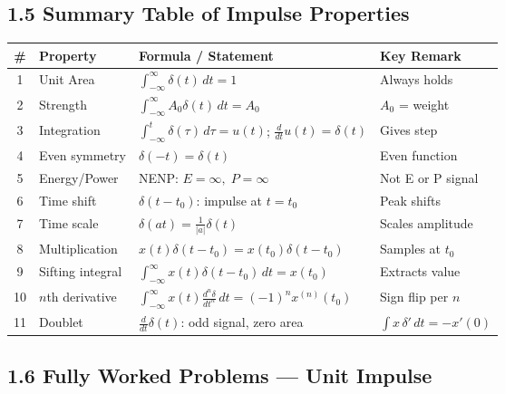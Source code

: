 \documentclass[10pt,a4paper]{article}
\newcommand{\Int}{\displaystyle\int_{-\infty}^{\infty}}
\newcommand{\Intt}{\displaystyle\int_{-\infty}^{t}}
\begin{document}
\subsection*{1.5 Summary Table of Impulse Properties}

\begin{center}
{\small
\begin{tabular}{@{}c l l l@{}}
\toprule
\textbf{\#} & \textbf{Property} & \textbf{Formula / Statement} & \textbf{Key Remark}\\
\midrule
1 & Unit Area & $\Int\delta(t)\,dt=1$ & Always holds \\[4pt]
2 & Strength & $\Int A_0\delta(t)\,dt=A_0$ & $A_0$ = weight \\[4pt]
3 & Integration & $\Intt\delta(\tau)\,d\tau=u(t)$; \quad $\tfrac{d}{dt}u(t)=\delta(t)$ & Gives step \\[4pt]
4 & Even symmetry & $\delta(-t)=\delta(t)$ & Even function \\[2pt]
5 & Energy/Power & NENP: $E=\infty,\;P=\infty$ & Not E or P signal \\[2pt]
6 & Time shift & $\delta(t-t_0)$: impulse at $t=t_0$ & Peak shifts \\[2pt]
7 & Time scale & $\delta(at)=\tfrac{1}{|a|}\delta(t)$ & Scales amplitude \\[4pt]
8 & Multiplication & $x(t)\delta(t-t_0)=x(t_0)\delta(t-t_0)$ & Samples at $t_0$ \\[4pt]
9 & Sifting integral & $\Int x(t)\delta(t-t_0)\,dt=x(t_0)$ & Extracts value \\[4pt]
10 & $n$th derivative & $\Int x(t)\frac{d^n\delta}{dt^n}\,dt=(-1)^n x^{(n)}(t_0)$ & Sign flip per $n$ \\[4pt]
11 & Doublet & $\tfrac{d}{dt}\delta(t)$: odd signal, zero area & $\int x\,\delta'\,dt=-x'(0)$ \\[2pt]
\bottomrule
\end{tabular}
}
\end{center}

\subsection*{1.6 Fully Worked Problems --- Unit Impulse}
\end{document}
